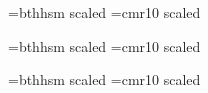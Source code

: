 %
%
%
%
\font\manjuzero=bthhsm scaled
\font\tenrmzero=cmr10 scaled

\font\manjuone=bthhsm scaled
\font\tenrmone=cmr10 scaled

\font\manjutwo=bthhsm scaled
\font\tenrmtwo=cmr10 scaled

\def\msize{%
	\def\manju{\manjuzero}%
	\def\tenrm{\tenrmzero}}

\def\msizei{%
	\def\manju{\manjuone}%
	\def\tenrm{\tenrmone}}

\def\msizeii{%
	\def\manju{\manjutwo}%
	\def\tenrm{\tenrmtwo}}

\def\bth{\manju}

\let\orgv\v
\let\orgd\=
%
{\gdef\@sv#1{\expandafter\ifx\csname #1\endcsname\s s'\else\orgv#1 \fi}}
{\gdef\@sd#1{\expandafter\ifx\csname #1\endcsname\u v\else\orgd#1 \fi}}
%
\def\ManjuTeX{Manju\TeX}
%
%
\def\UU{\={U}}
\def\uu{\={u}}
\def\sh{\v{s}}
\def\Sh{\v{S}}

